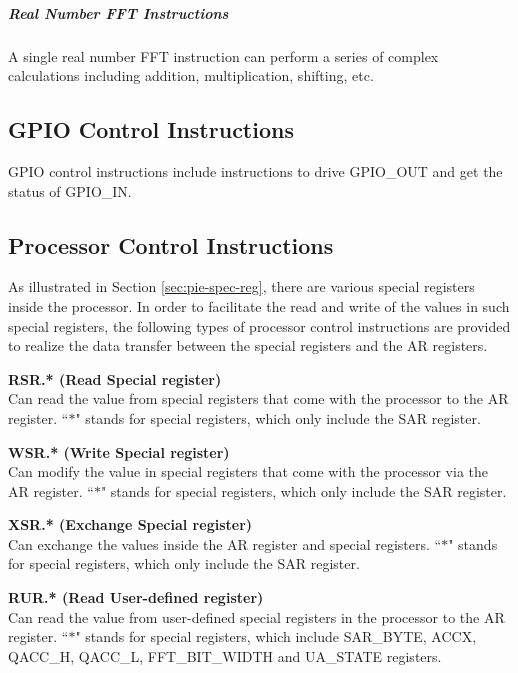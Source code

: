 \documentclass[main\_\_EN.tex]{subfiles}
\begin{document}
\subparagraph{Real Number FFT Instructions}

A single real number FFT instruction can perform a series of complex calculations including addition, multiplication, shifting, etc.




\subsection{GPIO Control Instructions}
\label{sec:pie-gpio-instrucitons}

GPIO control instructions include instructions to drive GPIO\_OUT and get the status of GPIO\_IN.




\subsection{Processor Control Instructions}
\label{sec:pie-processor-control-instrucitons}

As illustrated in Section \ref{sec:pie-spec-reg}, there are various special registers inside the \chipname{} processor. In order to facilitate the read and write of the values in such special registers, the following types of processor control instructions are provided to realize the data transfer between the special registers and the AR registers.

\textbf{RSR.* (Read Special register) } \\
Can read the value from special registers that come with the processor to the AR register. ``$*$" stands for special registers, which only include the SAR register.

\textbf{WSR.* (Write Special register) } \\
Can modify the value in special registers that come with the processor via the AR register. ``$*$" stands for special registers, which only include the SAR register.

\textbf{XSR.* (Exchange Special register) } \\
Can exchange the values inside the AR register and special registers. ``$*$" stands for special registers, which only include the SAR register.

\textbf{RUR.* (Read User-defined register) }\\
Can read the value from user-defined special registers in the processor to the AR register. ``$*$" stands for special registers, which include SAR\_BYTE, ACCX, QACC\_H, QACC\_L, FFT\_BIT\_WIDTH and UA\_STATE registers.
\end{document}
